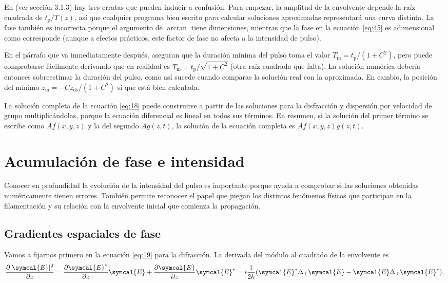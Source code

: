 \documentclass{scrartcl} %
\newcommand*{\pdv}[2]{\frac{\partial#1}{\partial#2}}
\newcommand*{\laplacian}{\Delta}
\begin{document}
En \cite{Couairon2011} (ver sección 3.1.3) hay tres erratas que pueden inducir a confusión. Para empezar, la amplitud de la envolvente depende la raíz cuadrada de $t_{\mathrm{p}}/T(z)$, así que cualquier programa bien escrito para calcular soluciones aproximadas representará una curva distinta. La fase también es incorrecta porque el argumento de $\arctan$ tiene dimensiones, mientras que la fase en la ecuación \eqref{eq:45} es adimensional como corresponde (aunque a efectos prácticos, este factor de fase no afecta a la intensidad de pulso). 

En el párrafo que va inmediatamente después, aseguran que la duración mínima del pulso toma el valor $T_{\mathrm{m}} = t_{\mathrm{p}}/(1+C^{2})$, pero puede comprobarse fácilmente derivando que en realidad es $T_{\mathrm{m}} = t_{\mathrm{p}}/\sqrt{1+C^{2}}$ (otra raíz cuadrada que falta). La solución numérica debería entonces sobreestimar la duración del pulso, como así sucede cuando comparas la solución real con la aproximada. En cambio, la posición del mínimo $z_{\mathrm{m}} = -Cz_{\mathrm{ds}}/(1+C^{2})$ sí que está bien calculada.

La solución completa de la ecuación \eqref{eq:18} puede construirse a partir de las soluciones para la disfracción y dispersión por velocidad de grupo multiplicándolas, porque la ecuación diferencial es lineal en todos sus términos. En resumen, si la solución del primer término se escribe como $Af(x,y,z)$ y la del segundo $Ag(z,t)$, la solución de la ecuación completa es $Af(x,y,z)g(z,t)$.

\section{Acumulación de fase e intensidad}\label{sec:3}
Conocer en profundidad la evolución de la intensidad del pulso es importante porque ayuda a comprobar si las soluciones obtenidas numéricamente tienen errores. También permite reconocer el papel que juegan los distintos fenómenos físicos que participan en la filamentación y su relación con la envolvente inicial que comienza la propagación.

\subsection{Gradientes espaciales de fase}\label{sec:31}
Vamos a fijarnos primero en la ecuación \eqref{eq:19} para la difracción. La derivada del módulo al cuadrado de la envolvente es
\begin{equation}\label{eq:46}
  \pdv{|\symcal{E}|^{2}}{z} = \pdv{\symcal{E}^{*}}{z}\symcal{E} + \pdv{\symcal{E}}{z}\symcal{E}^{*} = i \frac{1}{2k}(\symcal{E}^{*} \laplacian_{\perp}\symcal{E} - \symcal{E} \laplacian_{\perp}\symcal{E}^{*}).
\end{equation}
\end{document}
